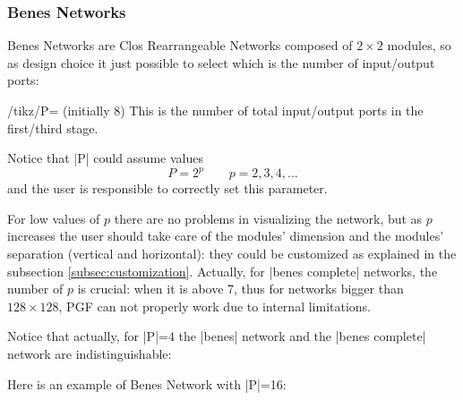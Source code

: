\documentclass{ltxdoc} %
\begin{document}
\begin{codeexample}[]
\begin{tikzpicture}
    \node[clos rear,N=9,r1=3,M=9,r3=3] {};
\end{tikzpicture}
\end{codeexample}

\subsubsection{Benes Networks}
\label{subsubsec:benes}
Benes Networks are Clos Rearrangeable Networks composed of $2 \times 2$ modules, so as design choice it just possible to select which is the number of input/output ports:

\begin{key}{/tikz/P= (initially 8)}
    This is the number of total input/output ports in the first/third stage.
\end{key}

Notice that |P| could assume values
\[P=2^p \qquad p=2,3,4,\ldots\]
and the user is responsible to correctly set this parameter.

For low values of $p$ there are no problems in visualizing the network, but as $p$ increases the user should take care of the modules' dimension  and the modules' separation (vertical and horizontal): they could be customized as explained in the subsection \ref{subsec:customization}. Actually, for |benes complete| networks, the number of $p$ is crucial: when it is above 7, thus for networks bigger than  $128\times 128$, PGF can not properly work due to internal limitations.

Notice that actually, for |P|=4 the |benes| network and the |benes complete| network are indistinguishable:
\begin{codeexample}[]
\begin{tikzpicture}
\tikzset{module size=0.5cm,
 pin length factor=0.5,
 module ysep=1}
 \node[P=4,benes] {};
 \begin{scope}[xshift=6cm]
     \node[module xsep=2.5,P=4,benes complete]{};
 \end{scope}
\end{tikzpicture}
\end{codeexample}


Here is an example of Benes Network with |P|=16:
\begin{codeexample}[]
\begin{tikzpicture}
    \node[P=16,benes] {};
\end{tikzpicture}
\end{codeexample}
\end{document}
